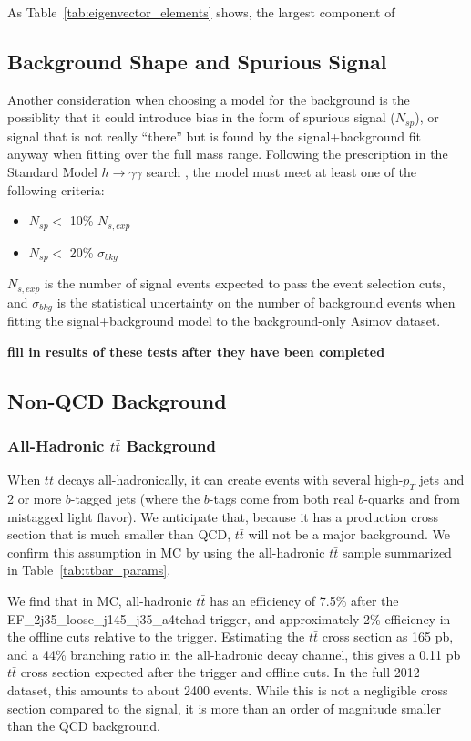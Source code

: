 As Table~\ref{tab:eigenvector_elements} shows, the largest component of




\subsection{Background Shape and Spurious Signal}
Another consideration when choosing a model for the background is the possiblity
that it could introduce bias in the form of spurious signal ($N_{sp}$), or signal that is 
not really ``there'' but is found by the signal+background fit anyway when fitting over the 
full mass range.  Following the prescription in the Standard Model $h\rightarrow\gamma\gamma$
search \cite{spurious_signal}, the model must meet at least one of the following
criteria:

\begin{itemize}
    \item $N_{sp}<$ 10\% $N_{s,exp}$
    \item $N_{sp}<$ 20\% $\sigma_{bkg}$
\end{itemize}

$N_{s,exp}$ is the number of signal events expected to pass the event selection cuts, and 
$\sigma_{bkg}$ is the statistical uncertainty on the number of background events when
fitting the signal+background model to the background-only Asimov dataset.

\textbf{fill in results of these tests after they have been completed}


\subsection{Non-QCD Background}
\label{sec:non_qcd_bkgs}

\subsubsection{All-Hadronic $t\bar{t}$ Background}
When $t\bar{t}$ decays all-hadronically, it can create events with several high-$p_T$
jets and 2 or more $b$-tagged jets (where the $b$-tags come from both real $b$-quarks
and from mistagged light flavor).  We anticipate that, because it has a production
cross section that is much smaller than QCD, $t\bar{t}$ will not be a major background.
We confirm this assumption in MC by using the all-hadronic $t\bar{t}$ sample summarized
in Table~\ref{tab:ttbar_params}.


We find that in MC, all-hadronic $t\bar{t}$ has an efficiency of 7.5\% after
the EF\_2j35\_loose\_j145\_j35\_a4tchad trigger, and approximately 2\% efficiency
in the offline cuts relative to the trigger.  Estimating the $t\bar{t}$ cross section
as 165 pb, and a 44\% branching ratio in the all-hadronic decay channel, this gives
a 0.11 pb $t\bar{t}$ cross section expected after the trigger and offline cuts.  In the
full 2012 dataset, this amounts to about 2400 events.  While
this is not a negligible cross section compared to the signal, it is more than an
order of magnitude smaller than the QCD background.

